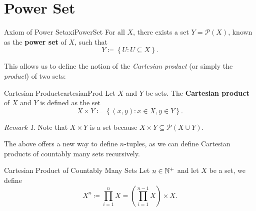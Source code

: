 \documentclass[math]{amznotes}
\theoremstyle{remark}
\newtheorem*{remark}{Remark}
\begin{document}
\section{Power Set}
\begin{axibox}{Axiom of Power Set}{axiPowerSet}
    For all $X$, there exists a set $Y = \mathcal{P}(X)$, known as the {\color{red} \textbf{power set}} of $X$, such that
    \begin{equation*}
        Y \coloneqq \left\{U \colon U \subseteq X\right\}.
    \end{equation*}
\end{axibox}
This allows us to define the notion of the \textit{Cartesian product} (or simply the \textit{product}) of two sets:
\begin{dfnbox}{Cartesian Product}{cartesianProd}
    Let $X$ and $Y$ be sets. The {\color{red} \textbf{Cartesian product}} of $X$ and $Y$ is defined as the set
    \begin{displaymath}
        X \times Y \coloneqq \left\{(x, y) \colon x \in X, y \in Y\right\}.
    \end{displaymath}
\end{dfnbox}
\begin{notebox}
    \begin{remark}
        Note that $X \times Y$ is a set because $X \times Y \subseteq \mathcal{P}(X \cup Y)$.
    \end{remark}
\end{notebox}
The above offers a new way to define $n$-tuples, as we can define Cartesian products of countably many sets recursively.
\begin{dfnbox}{Cartesian Product of Countably Many Sets}
    Let $n \in \mathbb{N}^+$ and let $X$ be a set, we define
    \begin{displaymath}
        X^n \coloneqq \prod_{i = 1}^n X = \left(\prod_{i = 1}^{n - 1} X\right) \times X.
    \end{displaymath}
\end{dfnbox}
\end{document}
